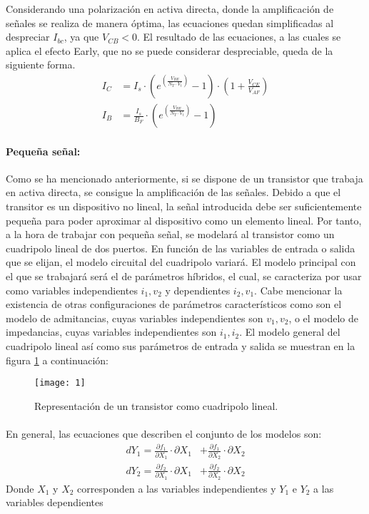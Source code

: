 Considerando una polarización en activa directa, donde la amplificación de señales se realiza de manera óptima, las ecuaciones quedan simplificadas al despreciar $I_{bc}$, ya que $V_{CB} < 0$. El resultado de las ecuaciones, a las cuales se aplica el efecto Early, que no se puede considerar despreciable, queda de la siguiente forma. 
\begin{align} 
   \label{eq:1}
   I_C &= I_s \cdot \left(e^{\left(\frac {V_{BE}}{N_{T} \cdot V_t} \right)} - 1\right) \cdot \left(1 + \frac{V_{CE}} {V_{AF}} \right)\\ 
   \label{eq:2}
   I_B &= \frac{I_s}{B_F} \cdot \left(e^{\left(\frac {V_{BE}}{N_{T} \cdot V_t} \right)} - 1\right)
\end{align}

\paragraph{Pequeña señal:}
Como se ha mencionado anteriormente, si se dispone de un transistor que trabaja en activa directa, se consigue la amplificación de las señales. 
Debido a que el transitor es un dispositivo no lineal, la señal introducida debe ser suficientemente pequeña para poder aproximar al dispositivo como un elemento lineal.
Por tanto, a la hora de trabajar con pequeña señal, se modelará al transistor como un cuadripolo lineal de dos puertos. 
En función de las variables de entrada o salida que se elijan, el modelo circuital del cuadripolo variará. El modelo principal con el que se trabajará será el de parámetros híbridos, el cual, se caracteriza por usar como variables independientes $i_1, v_2$ y dependientes $i_2, v_1$. Cabe mencionar la existencia de otras configuraciones de parámetros característicos como son el modelo de admitancias, cuyas variables independientes son $v_1, v_2$, o el modelo de impedancias, cuyas variables independientes son $i_1, i_2$.
El modelo general del cuadripolo lineal así como sus parámetros de entrada y salida se muestran en la figura \ref{fig:1} a continuaci\'on:
\begin{figure}[h]
    \centering
    \texttt{[image: 1]}
    \caption{Representación de un transistor como cuadripolo lineal.}
    \label{fig:1}
\end{figure}
\paragraph{}
En general, las ecuaciones que describen el conjunto de los modelos son:
\begin{align} 
   dY_1 = \frac {\partial f_1}{\partial X_1} \cdot \partial X_1 &+ \frac {\partial f_1}{\partial X_2} \cdot \partial X_2 \\ 
   dY_2 = \frac {\partial f_2}{\partial X_1} \cdot \partial X_1 &+ \frac {\partial f_2}{\partial X_2} \cdot \partial X_2 
\end{align}
Donde $X_1$ y $X_2$ corresponden a las variables independientes y $Y_1$ e $Y_2$ a las variables dependientes\\
